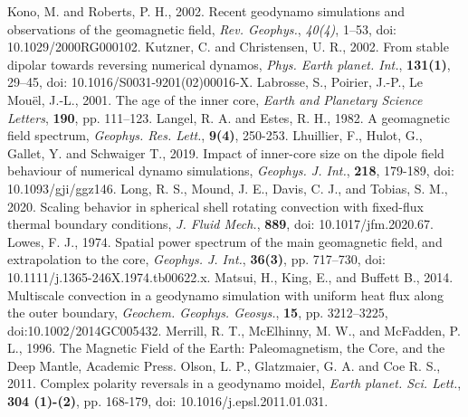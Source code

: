 \begin{thebibliography}{}
%
Kono, M. and Roberts, P. H., 2002. Recent geodynamo simulations and observations of the geomagnetic field, {\it Rev. Geophys.}, {\it 40(4)}, 1--53, doi: 10.1029/2000RG000102.
%
Kutzner, C. and Christensen, U. R., 2002. From stable dipolar towards reversing numerical dynamos, {\it Phys. Earth planet. Int.}, {\bf 131(1)}, 29--45, doi: 10.1016/S0031-9201(02)00016-X.
%
Labrosse, S., Poirier, J.-P., Le Mou{\"e}l, J.-L., 2001. The age of the inner core, {\it Earth and Planetary Science Letters}, {\bf 190}, pp. 111--123.
%
Langel, R. A. and Estes, R. H., 1982. A geomagnetic field spectrum, {\it Geophys. Res. Lett.}, {\bf 9(4)}, 250-253.
%
Lhuillier, F., Hulot, G., Gallet, Y. and Schwaiger T., 2019. Impact of inner-core size on the dipole field behaviour of numerical dynamo simulations, {\it Geophys. J. Int.}, {\bf 218}, 179-189, doi: 10.1093/gji/ggz146.
%
Long, R. S., Mound, J. E., Davis, C. J., and Tobias, S. M., 2020. Scaling behavior in spherical shell rotating convection with fixed-flux thermal boundary conditions, {\it J. Fluid Mech.}, {\bf 889}, doi: 10.1017/jfm.2020.67.
%
Lowes, F. J., 1974. Spatial power spectrum of the main geomagnetic field, and extrapolation to the core, {\it Geophys. J. Int.}, {\bf 36(3)}, pp. 717--730, doi: 10.1111/j.1365-246X.1974.tb00622.x.
%
Matsui, H., King, E., and Buffett B., 2014. Multiscale convection in a geodynamo simulation with uniform heat flux along the outer boundary, {\it Geochem. Geophys. Geosys.}, {\bf 15}, pp. 3212--3225, doi:10.1002/2014GC005432.
%
Merrill, R. T., McElhinny, M. W., and McFadden, P. L., 1996. The Magnetic Field of the Earth: Paleomagnetism, the Core, and the Deep Mantle, Academic Press.
%
Olson, L. P., Glatzmaier, G. A. and Coe R. S., 2011. Complex polarity reversals in a geodynamo moidel, {\it Earth planet. Sci. Lett.}, {\bf 304 (1)-(2)}, pp. 168-179, doi: 10.1016/j.epsl.2011.01.031.
%

\end{thebibliography}
